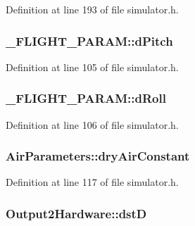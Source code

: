 Definition at line 193 of file simulator.\-h.

\hypertarget{group___h_i_t_l_plugin_gaff13db0c35d76e6eda91b623fb0fef8b}{
\subsubsection[{d\-Pitch}]{ \-\_\-\-F\-L\-I\-G\-H\-T\-\_\-\-P\-A\-R\-A\-M\-::d\-Pitch}}\label{group___h_i_t_l_plugin_gaff13db0c35d76e6eda91b623fb0fef8b}


Definition at line 105 of file simulator.\-h.

\hypertarget{group___h_i_t_l_plugin_gad9c4016b0ff06d6f0c8208ad1a94b281}{
\subsubsection[{d\-Roll}]{ \-\_\-\-F\-L\-I\-G\-H\-T\-\_\-\-P\-A\-R\-A\-M\-::d\-Roll}}\label{group___h_i_t_l_plugin_gad9c4016b0ff06d6f0c8208ad1a94b281}


Definition at line 106 of file simulator.\-h.

\hypertarget{group___h_i_t_l_plugin_ga343d7519080c3b70a59e554bfc2ed57d}{
\subsubsection[{dry\-Air\-Constant}]{ Air\-Parameters\-::dry\-Air\-Constant}}\label{group___h_i_t_l_plugin_ga343d7519080c3b70a59e554bfc2ed57d}


Definition at line 117 of file simulator.\-h.

\hypertarget{group___h_i_t_l_plugin_gaf1362ebbee3efc97a9c205aaffdeb98a}{
\subsubsection[{dst\-D}]{ Output2\-Hardware\-::dst\-D}}\label{group___h_i_t_l_plugin_gaf1362ebbee3efc97a9c205aaffdeb98a}


